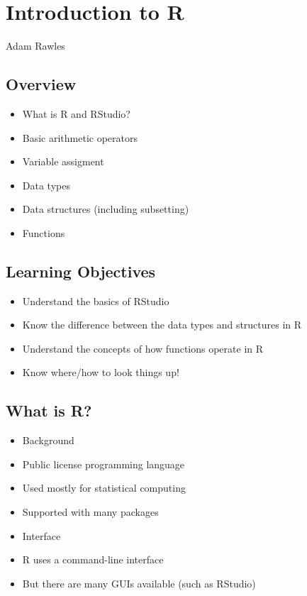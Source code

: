 \documentclass[]{article}
\title{}
\author{}
\date{}
\providecommand{\tightlist}{%
  \setlength{\itemsep}{0pt}\setlength{\parskip}{0pt}}
\begin{document}
\section{Introduction to R}\label{introduction-to-r}

Adam Rawles

\subsection{Overview}\label{overview}

\begin{itemize}
\tightlist
\item
  What is R and RStudio?
\item
  Basic arithmetic operators
\item
  Variable assigment
\item
  Data types
\item
  Data structures (including subsetting)
\item
  Functions
\end{itemize}

\subsection{Learning Objectives}\label{learning-objectives}

\begin{itemize}
\tightlist
\item
  Understand the basics of RStudio
\item
  Know the difference between the data types and structures in R
\item
  Understand the concepts of how functions operate in R
\item
  Know where/how to look things up!
\end{itemize}

\subsection{What is R?}\label{what-is-r}

\begin{itemize}
\item
  Background
\item
  Public license programming language
\item
  Used mostly for statistical computing
\item
  Supported with many packages
\item
  Interface
\item
  R uses a command-line interface
\item
  But there are many GUIs available (such as RStudio)
\end{itemize}
\end{document}
